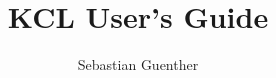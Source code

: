 \documentclass[english]{book}
\begin{document}
\author{Sebastian Guenther}
\title{KCL User's Guide}
\maketitle
\tableofcontents


\end{document}
